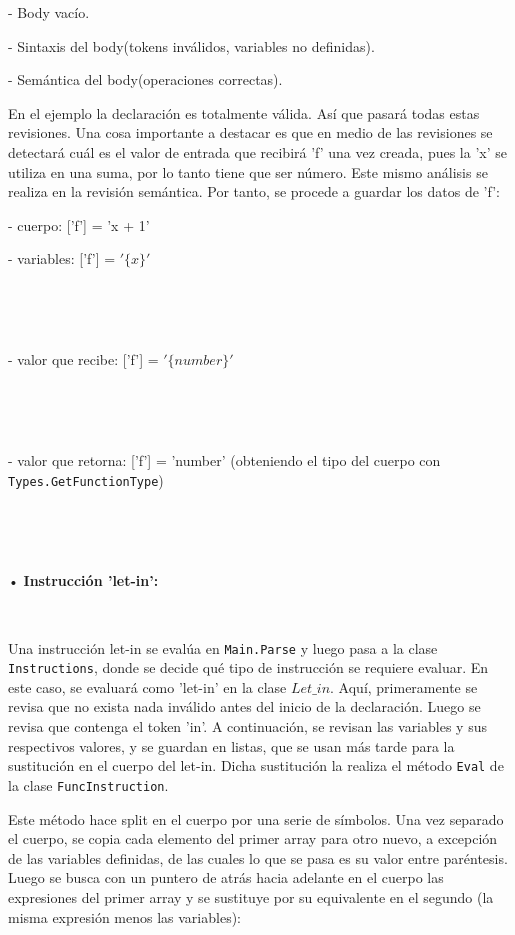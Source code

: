 \documentclass{article}
\begin{document}
- Body vacío.


- Sintaxis del body(tokens inválidos, variables no definidas).


- Semántica del body(operaciones correctas).


En el ejemplo la declaración es totalmente válida. Así que pasará todas estas revisiones. Una cosa importante a destacar
es que en medio de las revisiones se detectará cuál es el valor de entrada que recibirá 'f' una vez creada, pues la 'x' se
utiliza en una suma, por lo tanto tiene que ser número. Este mismo análisis se realiza en la revisión semántica. Por tanto,
se procede a guardar los datos de 'f':


- cuerpo: ['f'] = 'x + 1'


- variables: ['f'] = $'\{x\}'$


\ 




\ 


- valor que recibe: ['f'] = $'\{number\}'$


\ 





\ 


- valor que retorna: ['f'] = 'number' (obteniendo el tipo del cuerpo con {\texttt{Types.GetFunctionType}})


\ 





\ 


• \textbf{Instrucción 'let-in':}


\


Una instrucción let-in se evalúa en {\texttt{Main.Parse}} y luego pasa a la clase {\texttt{Instructions}}, donde
se decide qué tipo de instrucción se requiere evaluar. En este caso, se evaluará como 'let-in' en la clase
{\texttt{$Let\_in$}}. Aquí, primeramente se revisa que no exista nada inválido antes del inicio de la declaración. Luego
se revisa que contenga el token 'in'. A continuación, se revisan las variables y sus respectivos valores, y se guardan 
en listas, que se usan más tarde para la sustitución en el cuerpo del let-in. Dicha sustitución la realiza el
método {\texttt{Eval}} de la clase {\texttt{FuncInstruction}}.


Este método hace split en el cuerpo por una serie de símbolos. Una vez separado el cuerpo, se copia cada elemento del primer array para 
otro nuevo, a excepción de las variables definidas, de las cuales lo que se pasa es su valor entre paréntesis. Luego se busca con un 
puntero de atrás hacia adelante en el cuerpo las expresiones del primer array y se sustituye por su equivalente en el segundo (la misma 
expresión menos las variables): 
\end{document}
